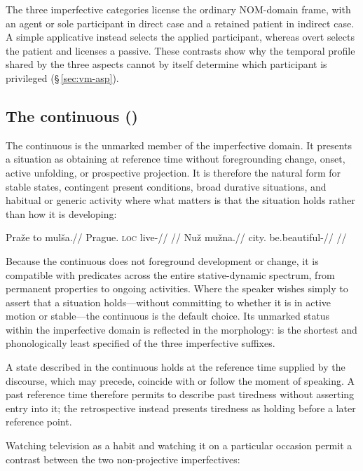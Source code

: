 The three imperfective categories license the ordinary NOM-domain frame,
with an agent or sole participant in direct case and a retained patient in
indirect case. A simple applicative instead selects the applied participant,
whereas overt  selects the patient and licenses a passive. These
contrasts show why the temporal profile shared by the three aspects cannot by
itself determine which participant is privileged (§\,\ref{sec:vm-asp}).

\subsection{The continuous ()}
The continuous is the unmarked member of the imperfective domain. It presents
a situation as obtaining at reference time without foregrounding change, onset,
active unfolding, or prospective projection. It is therefore the natural form
for stable states, contingent present conditions, broad durative situations, and
habitual or generic activity where what matters is that the situation holds
rather than how it is developing:

\pex
\a
\begingl
\gla Praže to mulša.//
\glb Prague.\Ind{} \textsc{loc} live-\Cont{}//
\glft {} //
\endgl
\a
\begingl
\gla Nuž mužna.//
\glb city.\Dir{} be.beautiful-\Cont{}//
\glft {} //
\endgl
\xe

Because the continuous does not foreground development or change, it is
compatible with predicates across the entire stative-dynamic spectrum, from
permanent properties to ongoing activities. Where the speaker wishes simply to
assert that a situation holds---without committing to whether it is in active
motion or stable---the continuous is the default choice. Its unmarked status
within the imperfective domain is reflected in the morphology:  is the
shortest and phonologically least specified of the three imperfective suffixes.

A state described in the continuous holds at the reference time supplied by
the discourse, which may precede, coincide with or follow the moment of
speaking. A past reference time therefore permits  to describe
past tiredness without asserting entry into it; the retrospective instead
presents tiredness as holding before a later reference point.

Watching television as a habit and watching it on a particular occasion
permit a contrast between the two non-projective imperfectives:

